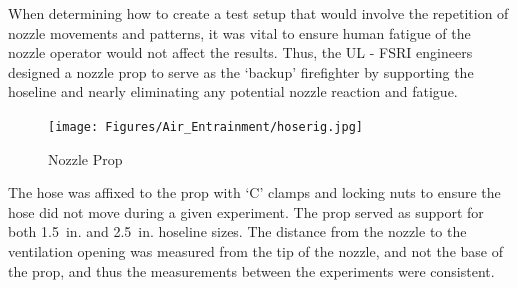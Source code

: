 \documentclass{article}
\begin{document}
When determining how to create a test setup that would involve the repetition of nozzle movements and patterns, it was vital to ensure human fatigue of the nozzle operator would not affect the results. Thus, the UL - FSRI engineers designed a nozzle prop to serve as the `backup' firefighter by supporting the hoseline and nearly eliminating any potential nozzle reaction and fatigue. 

\begin{figure}[!ht]
\centering
	\texttt{[image: Figures/Air\_Entrainment/hoserig.jpg]}
	\caption{Nozzle Prop}
	\label{fig:Nozzle_Prop}
\end{figure}

\clearpage

The hose was affixed to the prop with `C' clamps and locking nuts to ensure the hose did not move during a given experiment. The prop served as support for both 1.5~in. and 2.5~in. hoseline sizes. The distance from the nozzle to the ventilation opening was measured from the tip of the nozzle, and not the base of the prop, and thus the measurements between the experiments were consistent.

\vspace*{\baselineskip}
\end{document}
